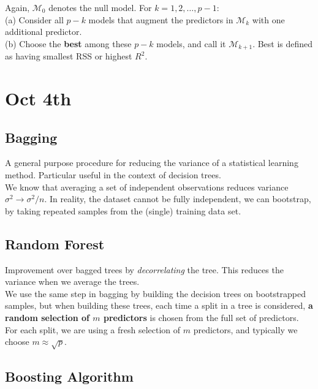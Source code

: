\documentclass{article}
\begin{document}
Again, $\mathcal{M}_0$ denotes the null model. For $k = 1, 2, \dots, p-1$:\\
(a) Consider all $p-k$ models that augment the predictors in $\mathcal{M}_k$ with one additional predictor.\\
(b) Choose the \textbf{best} among these $p-k$ models, and call it $\mathcal{M}_{k+1}$. Best is defined as having smallest RSS or highest $R^2$.

\section{Oct 4th}

\subsection{Bagging}

A general purpose procedure for reducing the variance of a statistical learning method. Particular useful in the context of decision trees.\\

We know that averaging a set of independent observations reduces variance $\sigma^2 \longrightarrow \sigma^2/n$. In reality, the dataset cannot be fully independent, we can bootstrap, by taking repeated samples from the (single) training data set.\\

\subsection{Random Forest}

Improvement over bagged trees by \textit{decorrelating} the tree. This reduces the variance when we average the trees.\\

We use the same step in bagging by building the decision trees on bootstrapped samples, but when building these trees, each time a split in a tree is considered, \textbf{a random selection of $m$ predictors} is chosen from the full set of predictors. \\

For each split, we are using a fresh selection of $m$ predictors, and typically we choose $m \approx \sqrt{p}$.

\subsection{Boosting Algorithm}
\end{document}
